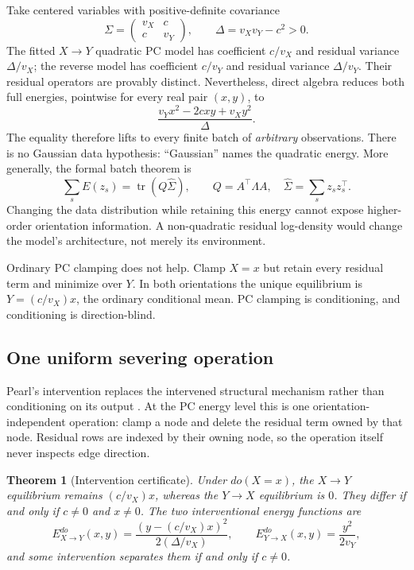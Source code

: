 \documentclass[11pt]{article}
\newtheorem{theorem}{Theorem}[section]
\begin{document}
Take centered variables with positive-definite covariance
\[
\Sigma=\begin{pmatrix}v_X&c\\c&v_Y\end{pmatrix},
\qquad \Delta=v_Xv_Y-c^2>0.
\]
The fitted $X\to Y$ quadratic PC model has coefficient $c/v_X$ and residual variance
$\Delta/v_X$; the reverse model has coefficient $c/v_Y$ and residual variance
$\Delta/v_Y$.  Their residual operators are provably distinct.  Nevertheless, direct
algebra reduces both full energies, pointwise for every real pair $(x,y)$, to
\[
\frac{v_Yx^2-2cxy+v_Xy^2}{\Delta}.
\]
The equality therefore lifts to every finite batch of \emph{arbitrary} observations.
There is no Gaussian data hypothesis: ``Gaussian'' names the quadratic energy.  More
generally, the formal batch theorem is
\[
\sum_s E(z_s)=\operatorname{tr}(Q\widehat\Sigma),
\qquad
Q=A^\top\Lambda A,
\quad
\widehat\Sigma=\sum_s z_s z_s^\top .
\]
Changing the data distribution while retaining this energy cannot expose higher-order
orientation information.  A non-quadratic residual log-density would change the model's
architecture, not merely its environment.

Ordinary PC clamping does not help.  Clamp $X=x$ but retain every residual term and
minimize over $Y$.  In both orientations the unique equilibrium is
$Y=(c/v_X)x$, the ordinary conditional mean.  PC clamping is conditioning, and
conditioning is direction-blind.

\subsection{One uniform severing operation}

Pearl's intervention replaces the intervened structural mechanism rather than
conditioning on its output \cite{pearl2012,halpern2000}.  At the PC energy level this is
one orientation-independent operation: clamp a node and delete the residual term owned
by that node.  Residual rows are indexed by their owning node, so the operation itself
never inspects edge direction.

\begin{theorem}[Intervention certificate]\label{thm:intervention}
Under $do(X=x)$, the $X\to Y$ equilibrium remains $(c/v_X)x$, whereas the $Y\to X$
equilibrium is $0$.  They differ if and only if $c\ne0$ and $x\ne0$.  The two
interventional energy functions are
\[
E^{do}_{X\to Y}(x,y)=\frac{(y-(c/v_X)x)^2}{2(\Delta/v_X)},
\qquad
E^{do}_{Y\to X}(x,y)=\frac{y^2}{2v_Y},
\]
and some intervention separates them if and only if $c\ne0$.
\end{theorem}
\end{document}
